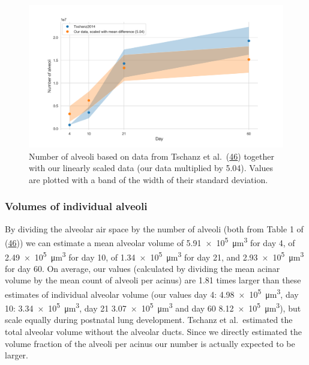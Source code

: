 \documentclass[
  american,
]{article}
\begin{document}
\begin{figure}
\hypertarget{fig:08}{%
\centering
\includegraphics{images/fig08.png}
\caption{Number of alveoli based on data from Tschanz et al.~(\protect\hyperlink{ref-wnl86DEM}{46}) together with our linearly scaled data (our data multiplied by 5.04).
Values are plotted with a band of the width of their standard deviation.}\label{fig:08}
}
\end{figure}

\hypertarget{volumes-of-individual-alveoli}{%
\subsubsection{Volumes of individual alveoli}\label{volumes-of-individual-alveoli}}

By dividing the alveolar air space by the number of alveoli (both from Table 1 of (\protect\hyperlink{ref-wnl86DEM}{46})) we can estimate a mean alveolar volume of 5.91~×~10\textsuperscript{5}~μm\textsuperscript{3} for day 4, of 2.49~×~10\textsuperscript{5}~μm\textsuperscript{3} for day 10, of 1.34~×~10\textsuperscript{5}~μm\textsuperscript{3} for day 21, and 2.93~×~10\textsuperscript{5}~μm\textsuperscript{3} for day 60.
On average, our values (calculated by dividing the mean acinar volume by the mean count of alveoli per acinus) are 1.81 times larger than these estimates of individual alveolar volume (our values day 4: 4.98~×~10\textsuperscript{5}~μm\textsuperscript{3}, day 10: 3.34~×~10\textsuperscript{5}~μm\textsuperscript{3}, day 21 3.07~×~10\textsuperscript{5}~μm\textsuperscript{3} and day 60 8.12~×~10\textsuperscript{5}~μm\textsuperscript{3}), but scale equally during postnatal lung development.
Tschanz et al.~estimated the total alveolar volume without the alveolar ducts.
Since we directly estimated the volume fraction of the alveoli per acinus our number is actually expected to be larger.
\end{document}
